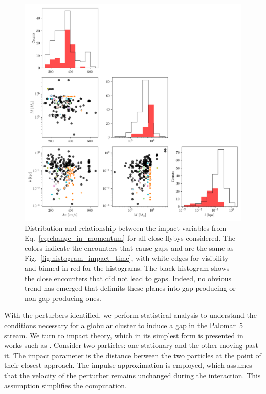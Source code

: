         \begin{figure}
            \centering
            \includegraphics[width=\linewidth]{images/impact_geometry_statistics.png}
            \caption{Distribution and relationship between the impact variables from Eq.~\ref{eq:change_in_momentum} for all close flybys considered. The colors indicate the encounters that cause gaps and are the same as Fig.~\ref{fig:histogram_impact_time}, with white edges for visibility and binned in red for the histograms. The black histogram shows the close encounters that did not lead to gaps. Indeed, no obvious trend has emerged that delimits these planes into gap-producing or non-gap-producing ones.}
            \label{fig:impact_geometry_statistics}    
        \end{figure}    

        With the perturbers identified, we perform statistical analysis to understand the conditions necessary for a globular cluster to induce a gap in the Palomar~5 stream. We turn to impact theory, which in its simplest form is presented in works such as \citet{2008gady.book.....B}. Consider two particles: one stationary and the other moving past it. The impact parameter is the distance between the two particles at the point of their closest approach. The impulse approximation is employed, which assumes that the velocity of the perturber remains unchanged during the interaction. This assumption simplifies the computation.

